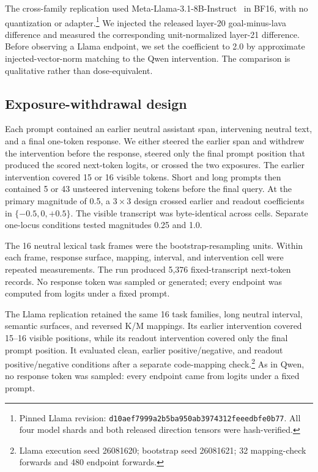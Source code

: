 \documentclass[10pt,twocolumn]{article}
\begin{document}
The cross-family replication used Meta-Llama-3.1-8B-Instruct~\cite{nousllama2024,llama2024} in BF16, with no quantization or adapter.\footnote{Pinned Llama revision: \nolinkurl{d10aef7999a2b5ba950ab3974312feeedbfe0b77}. All four model shards and both released direction tensors were hash-verified.} We injected the released layer-20 goal-minus-lava difference and measured the corresponding unit-normalized layer-21 difference. Before observing a Llama endpoint, we set the coefficient to 2.0 by approximate injected-vector-norm matching to the Qwen intervention. The comparison is qualitative rather than dose-equivalent.

\subsection{Exposure-withdrawal design}

Each prompt contained an earlier neutral assistant span, intervening neutral text, and a final one-token response. We either steered the earlier span and withdrew the intervention before the response, steered only the final prompt position that produced the scored next-token logits, or crossed the two exposures. The earlier intervention covered 15 or 16 visible tokens. Short and long prompts then contained 5 or 43 unsteered intervening tokens before the final query. At the primary magnitude of 0.5, a $3\times3$ design crossed earlier and readout coefficients in $\{-0.5,0,+0.5\}$. The visible transcript was byte-identical across cells. Separate one-locus conditions tested magnitudes 0.25 and 1.0.

The 16 neutral lexical task frames were the bootstrap-resampling units. Within each frame, response surface, mapping, interval, and intervention cell were repeated measurements. The run produced 5,376 fixed-transcript next-token records. No response token was sampled or generated; every endpoint was computed from logits under a fixed prompt.

The Llama replication retained the same 16 task families, long neutral interval, semantic surfaces, and reversed K/M mappings. Its earlier intervention covered 15--16 visible positions, while its readout intervention covered only the final prompt position. It evaluated clean, earlier positive/negative, and readout positive/negative conditions after a separate code-mapping check.\footnote{Llama execution seed 26081620; bootstrap seed 26081621; 32 mapping-check forwards and 480 endpoint forwards.} As in Qwen, no response token was sampled: every endpoint came from logits under a fixed prompt.
\end{document}
